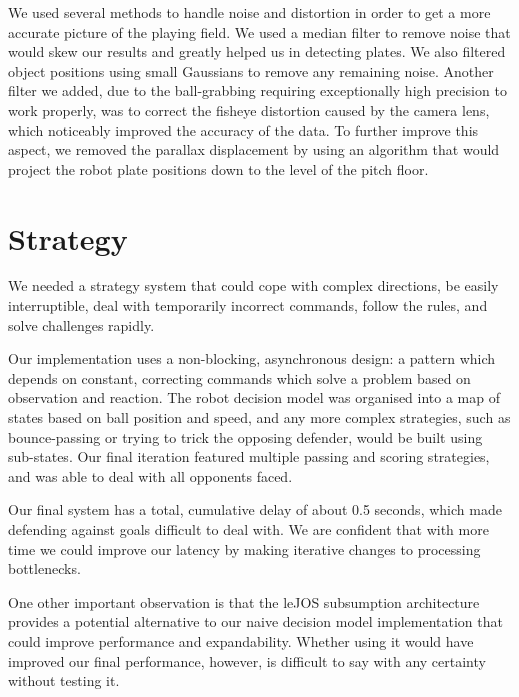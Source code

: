 \documentclass[a4paper,11pt]{article}
\begin{document}
We used several methods to handle noise and distortion in order to get a more accurate picture of the playing field. We used a median filter to remove noise that would skew our results and greatly helped us in detecting plates. We also filtered object positions using small Gaussians to remove any remaining noise. Another filter we added, due to the ball-grabbing requiring exceptionally high precision to work properly, was to correct the fisheye distortion caused by the camera lens, which noticeably improved the accuracy of the data. To further improve this aspect, we removed the parallax displacement by using an algorithm that would project the robot plate positions down to the level of the pitch floor.
    


\section{Strategy}

We needed a strategy system that could cope with complex directions, be easily interruptible, deal with temporarily incorrect commands, follow the rules, and solve challenges rapidly.

Our implementation uses a non-blocking, asynchronous design: a pattern which depends on constant, correcting commands which solve a problem based on observation and reaction. The robot decision model was organised into a map of states based on ball position and speed, and any more complex strategies, such as bounce-passing or trying to trick the opposing defender, would be built using sub-states. Our final iteration featured multiple passing and scoring strategies, and was able to deal with all opponents faced.

Our final system has a total, cumulative delay of about 0.5 seconds, which made defending against goals difficult to deal with. We are confident that with more time we could improve our latency by making iterative changes to processing bottlenecks.

One other important observation is that the leJOS subsumption architecture provides a potential alternative to our naive decision model implementation that could improve performance and expandability. Whether using it would have improved our final performance, however, is difficult to say with any certainty without testing it.
\end{document}
